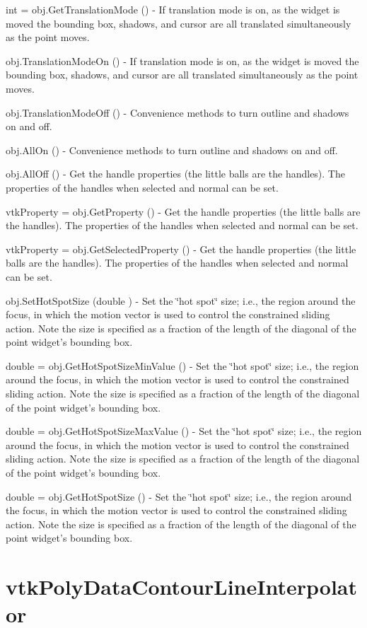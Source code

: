 \begin{DoxyItemize}
\item {\ttfamily int = obj.\-Get\-Translation\-Mode ()} -\/ If translation mode is on, as the widget is moved the bounding box, shadows, and cursor are all translated simultaneously as the point moves.  
\item {\ttfamily obj.\-Translation\-Mode\-On ()} -\/ If translation mode is on, as the widget is moved the bounding box, shadows, and cursor are all translated simultaneously as the point moves.  
\item {\ttfamily obj.\-Translation\-Mode\-Off ()} -\/ Convenience methods to turn outline and shadows on and off.  
\item {\ttfamily obj.\-All\-On ()} -\/ Convenience methods to turn outline and shadows on and off.  
\item {\ttfamily obj.\-All\-Off ()} -\/ Get the handle properties (the little balls are the handles). The properties of the handles when selected and normal can be set.  
\item {\ttfamily vtk\-Property = obj.\-Get\-Property ()} -\/ Get the handle properties (the little balls are the handles). The properties of the handles when selected and normal can be set.  
\item {\ttfamily vtk\-Property = obj.\-Get\-Selected\-Property ()} -\/ Get the handle properties (the little balls are the handles). The properties of the handles when selected and normal can be set.  
\item {\ttfamily obj.\-Set\-Hot\-Spot\-Size (double )} -\/ Set the \char`\"{}hot spot\char`\"{} size; i.\-e., the region around the focus, in which the motion vector is used to control the constrained sliding action. Note the size is specified as a fraction of the length of the diagonal of the point widget's bounding box.  
\item {\ttfamily double = obj.\-Get\-Hot\-Spot\-Size\-Min\-Value ()} -\/ Set the \char`\"{}hot spot\char`\"{} size; i.\-e., the region around the focus, in which the motion vector is used to control the constrained sliding action. Note the size is specified as a fraction of the length of the diagonal of the point widget's bounding box.  
\item {\ttfamily double = obj.\-Get\-Hot\-Spot\-Size\-Max\-Value ()} -\/ Set the \char`\"{}hot spot\char`\"{} size; i.\-e., the region around the focus, in which the motion vector is used to control the constrained sliding action. Note the size is specified as a fraction of the length of the diagonal of the point widget's bounding box.  
\item {\ttfamily double = obj.\-Get\-Hot\-Spot\-Size ()} -\/ Set the \char`\"{}hot spot\char`\"{} size; i.\-e., the region around the focus, in which the motion vector is used to control the constrained sliding action. Note the size is specified as a fraction of the length of the diagonal of the point widget's bounding box.  
\end{DoxyItemize}\hypertarget{vtkwidgets_vtkpolydatacontourlineinterpolator}{}\section{vtk\-Poly\-Data\-Contour\-Line\-Interpolator}\label{vtkwidgets_vtkpolydatacontourlineinterpolator}
